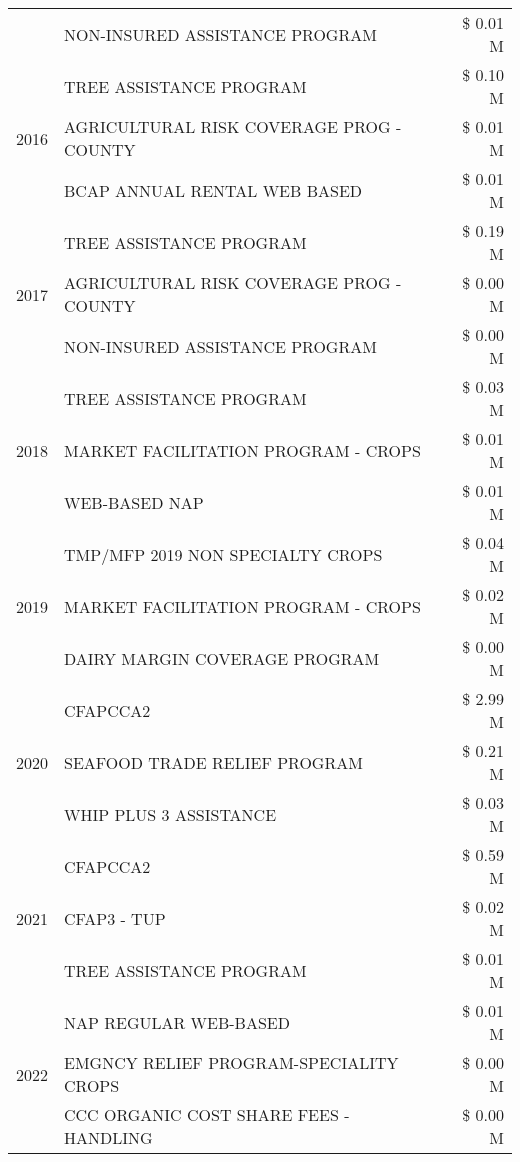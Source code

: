 \begin{tabular}{llr}
 & NON-INSURED ASSISTANCE PROGRAM & \$ 0.01 M \\
\cline{1-3}
\multirow[t]{3}{*}{2016} & TREE ASSISTANCE PROGRAM & \$ 0.10 M \\
 & AGRICULTURAL RISK COVERAGE PROG - COUNTY & \$ 0.01 M \\
 & BCAP ANNUAL RENTAL WEB BASED & \$ 0.01 M \\
\cline{1-3}
\multirow[t]{3}{*}{2017} & TREE ASSISTANCE PROGRAM & \$ 0.19 M \\
 & AGRICULTURAL RISK COVERAGE PROG - COUNTY & \$ 0.00 M \\
 & NON-INSURED ASSISTANCE PROGRAM & \$ 0.00 M \\
\cline{1-3}
\multirow[t]{3}{*}{2018} & TREE ASSISTANCE PROGRAM & \$ 0.03 M \\
 & MARKET FACILITATION PROGRAM - CROPS & \$ 0.01 M \\
 & WEB-BASED NAP & \$ 0.01 M \\
\cline{1-3}
\multirow[t]{3}{*}{2019} & TMP/MFP 2019 NON SPECIALTY CROPS & \$ 0.04 M \\
 & MARKET FACILITATION PROGRAM - CROPS & \$ 0.02 M \\
 & DAIRY MARGIN COVERAGE PROGRAM & \$ 0.00 M \\
\cline{1-3}
\multirow[t]{3}{*}{2020} & CFAPCCA2 & \$ 2.99 M \\
 & SEAFOOD TRADE RELIEF PROGRAM & \$ 0.21 M \\
 & WHIP PLUS 3 ASSISTANCE & \$ 0.03 M \\
\cline{1-3}
\multirow[t]{3}{*}{2021} & CFAPCCA2 & \$ 0.59 M \\
 & CFAP3 - TUP & \$ 0.02 M \\
 & TREE ASSISTANCE PROGRAM & \$ 0.01 M \\
\cline{1-3}
\multirow[t]{3}{*}{2022} & NAP REGULAR WEB-BASED & \$ 0.01 M \\
 & EMGNCY RELIEF PROGRAM-SPECIALITY CROPS & \$ 0.00 M \\
 & CCC ORGANIC COST SHARE FEES - HANDLING & \$ 0.00 M \\
\cline{1-3}
\bottomrule
\end{tabular}
